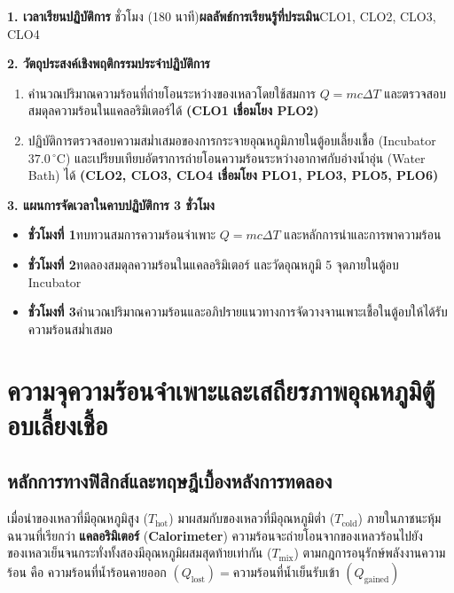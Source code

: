 \cleardoublepage
{}
\begin{planbox}
\noindent\textbf{1. เวลาเรียนปฏิบัติการ} ชั่วโมง (180 นาที)\quad \textbf{ผลลัพธ์การเรียนรู้ที่ประเมิน}\quad CLO1, CLO2, CLO3, CLO4

\noindent\textbf{2. วัตถุประสงค์เชิงพฤติกรรมประจำปฏิบัติการ}
\begin{enumerate}
    \item คำนวณปริมาณความร้อนที่ถ่ายโอนระหว่างของเหลวโดยใช้สมการ $Q = mc\Delta T$ และตรวจสอบสมดุลความร้อนในแคลอริมิเตอร์ได้ \textbf{(CLO1 เชื่อมโยง PLO2)}
    \item ปฏิบัติการตรวจสอบความสม่ำเสมอของการกระจายอุณหภูมิภายในตู้อบเลี้ยงเชื้อ (Incubator $37.0\,^\circ\text{C}$) และเปรียบเทียบอัตราการถ่ายโอนความร้อนระหว่างอากาศกับอ่างน้ำอุ่น (Water Bath) ได้ \textbf{(CLO2, CLO3, CLO4 เชื่อมโยง PLO1, PLO3, PLO5, PLO6)}
\end{enumerate}

\noindent\textbf{3. แผนการจัดเวลาในคาบปฏิบัติการ 3 ชั่วโมง}
\begin{itemize}
    \item \textbf{ชั่วโมงที่ 1}\quad ทบทวนสมการความร้อนจำเพาะ $Q = mc\Delta T$ และหลักการนำและการพาความร้อน
    \item \textbf{ชั่วโมงที่ 2}\quad ทดลองสมดุลความร้อนในแคลอริมิเตอร์ และวัดอุณหภูมิ 5 จุดภายในตู้อบ Incubator
    \item \textbf{ชั่วโมงที่ 3}\quad คำนวณปริมาณความร้อนและอภิปรายแนวทางการจัดวางจานเพาะเชื้อในตู้อบให้ได้รับความร้อนสม่ำเสมอ
\end{itemize}
\end{planbox}
\clearpage

\chapter{ความจุความร้อนจำเพาะและเสถียรภาพอุณหภูมิตู้อบเลี้ยงเชื้อ}

\section{หลักการทางฟิสิกส์และทฤษฎีเบื้องหลังการทดลอง}

เมื่อนำของเหลวที่มีอุณหภูมิสูง ($T_{\text{hot}}$) มาผสมกับของเหลวที่มีอุณหภูมิต่ำ ($T_{\text{cold}}$) ภายในภาชนะหุ้มฉนวนที่เรียกว่า \textbf{แคลอริมิเตอร์} (\textbf{Calorimeter}) ความร้อนจะถ่ายโอนจากของเหลวร้อนไปยังของเหลวเย็นจนกระทั่งทั้งสองมีอุณหภูมิผสมสุดท้ายเท่ากัน ($T_{\text{mix}}$) ตามกฎการอนุรักษ์พลังงานความร้อน คือ $\text{ความร้อนที่น้ำร้อนคายออก } (Q_{\text{lost}}) = \text{ความร้อนที่น้ำเย็นรับเข้า } (Q_{\text{gained}})$

